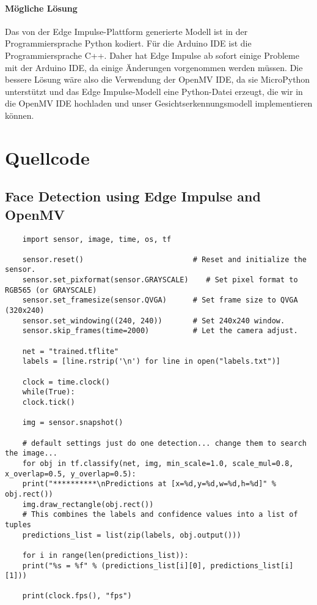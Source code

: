 \subsubsection{Mögliche Lösung}

Das von der Edge Impulse-Plattform generierte Modell ist in der Programmiersprache Python kodiert. Für die Arduino IDE ist die Programmiersprache C++. Daher hat Edge Impulse ab sofort einige Probleme mit der Arduino IDE, da einige Änderungen vorgenommen werden müssen. Die bessere Lösung wäre also die Verwendung der OpenMV IDE, da sie MicroPython unterstützt und das Edge Impulse-Modell eine Python-Datei erzeugt, die wir in die OpenMV IDE hochladen und unser Gesichtserkennungsmodell implementieren können.


\chapter{Quellcode}




\section{Face Detection using Edge Impulse and OpenMV}

\begin{verbatim}
	import sensor, image, time, os, tf
	
	sensor.reset()                         # Reset and initialize the sensor.
	sensor.set_pixformat(sensor.GRAYSCALE)    # Set pixel format to RGB565 (or GRAYSCALE)
	sensor.set_framesize(sensor.QVGA)      # Set frame size to QVGA (320x240)
	sensor.set_windowing((240, 240))       # Set 240x240 window.
	sensor.skip_frames(time=2000)          # Let the camera adjust.
	
	net = "trained.tflite"
	labels = [line.rstrip('\n') for line in open("labels.txt")]
	
	clock = time.clock()
	while(True):
	clock.tick()
	
	img = sensor.snapshot()
	
	# default settings just do one detection... change them to search the image...
	for obj in tf.classify(net, img, min_scale=1.0, scale_mul=0.8, x_overlap=0.5, y_overlap=0.5):
	print("**********\nPredictions at [x=%d,y=%d,w=%d,h=%d]" % obj.rect())
	img.draw_rectangle(obj.rect())
	# This combines the labels and confidence values into a list of tuples
	predictions_list = list(zip(labels, obj.output()))
	
	for i in range(len(predictions_list)):
	print("%s = %f" % (predictions_list[i][0], predictions_list[i][1]))
	
	print(clock.fps(), "fps")
	
\end{verbatim}




